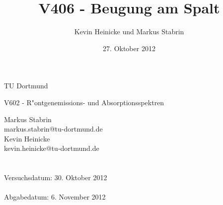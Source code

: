 \documentclass{scrartcl}
\title{V406 - Beugung am Spalt}
\date{27. Oktober 2012}
\author{Kevin Heinicke und Markus Stabrin}
\begin{document}
	
	\vspace*{3cm}

	\begin{center}
		\large
		TU Dortmund
	\end{center}

	\begin{center}
		\Huge
		V602 - R"ontgenemissions- und Absorptionsspektren
	\end{center}

	\vspace{6cm}
	\begin{center}
		\begin{minipage}[b]{8cm}
			\Large
			Markus Stabrin \\
			\normalsize
			markus.stabrin@tu-dortmund.de \\

			\Large
			Kevin Heinicke\\
			\normalsize
			kevin.heinicke@tu-dortmund.de \\
			\\
			\\

			Versuchsdatum: 30. Oktober 2012 \\
			\\
			Abgabedatum: 6. November 2012
		\end{minipage}
	\end{center}

	\newpage


	

	

	
\end{document}
